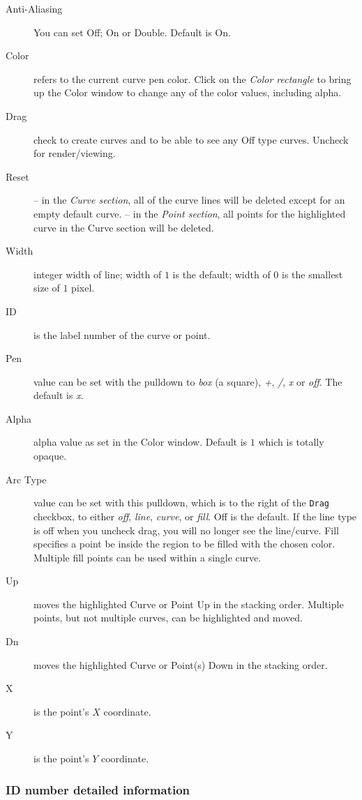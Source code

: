 {\begin{description}
	\item[Anti-Aliasing] You can set Off; On or Double. Default is On.
    \item[Color] refers to the current curve pen color. Click on the \textit{Color rectangle} to bring up the Color window to change any of the color values, including alpha.
    \item[Drag] check to create curves and to be able to see any Off type curves. Uncheck for render/viewing.
    \item[Reset] -- in the \textit{Curve section}, all of the curve lines will be deleted except for an empty default curve.
    -- in the \textit{Point section}, all points for the highlighted curve in the Curve section will be deleted.
    \item[Width] integer width of line; width of $1$ is the default; width of $0$ is the smallest size of $1$ pixel.
    \item[ID] is the label number of the curve or point.
    \item[Pen] value can be set with the pulldown to \textit{box} (a square), \textit{+}, \textit{/}, \textit{x} or \textit{off}. The default is \textit{x}.
    \item[Alpha] alpha value as set in the Color window. Default is $1$ which is totally opaque.
    \item[Arc Type] value can be set with this pulldown, which is to the right of the \texttt{Drag} checkbox, to either \textit{off}, \textit{line}, \textit{curve}, or \textit{fill}. Off is the default. If the line type is off when you uncheck drag, you will no longer see the line/curve. Fill specifies a point be inside the region to be filled with the chosen color. Multiple fill points can be used within a single curve.
    \item[Up] moves the highlighted Curve or Point Up in the stacking order. Multiple points, but not multiple curves, can be highlighted and moved.
    \item[Dn] moves the highlighted Curve or Point(s) Down in the stacking order.
    \item[X] is the point’s $X$ coordinate.
    \item[Y] is the point’s $Y$ coordinate.
\end{description}

\subsubsection*{ID number detailed information}%
\label{ssub:id_number_detailed_information}

}

